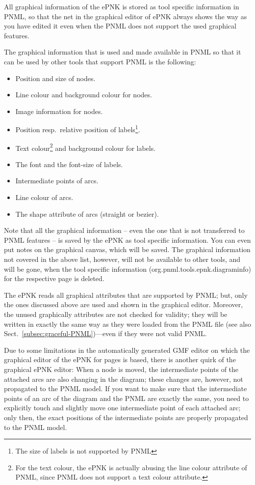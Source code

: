 All graphical information of the ePNK is stored as tool specific information in PNML,
so that the net in the graphical editor of ePNK always shows the way as you have
edited it even when the PNML does not support the used graphical features.

The graphical information that is used and made available in PNML
so that it can be used by other tools that support PNML is the following:
\begin{itemize}
  \item Position and size of nodes.
  \item Line colour and background colour for nodes.
  \item Image information for nodes.
  \item Position resp.\ relative position of labels\footnote
          {The size of labels is not supported by PNML}.
  \item Text colour\footnote
          {For the text colour, the ePNK is actually abusing the line colour
           attribute of PNML, since PNML does not support a text colour
           attribute.}
        and background colour for labels.
  \item The font and the font-size of labels.
  \item Intermediate points of arcs.
  \item Line colour of arcs.
  \item The shape attribute of arcs (straight or bezier).
\end{itemize}

Note that all the graphical information -- even the one that is not transferred
to PNML features -- is saved by the ePNK as tool specific information. You can
even put notes on the graphical canvas, which will be saved. The graphical
information not covered in the above list, however, will not be available to
other tools, and will be gone, when the tool specific information
(org.pnml.tools.epnk.diagraminfo) for the respective page is deleted.

The ePNK reads all graphical attributes that are supported by PNML;
but, only the ones discussed above are used and shown in the graphical editor.
Moreover, the unused graphically attributes are not checked for
validity; they will be written in exactly the same way as they were loaded
from the PNML file (see also Sect.~\ref{subsec:graceful-PNML})---even if
they were not valid PNML.

Due to some limitations in the automatically generated GMF editor on which
the graphical editor of the ePNK for pages is based, there is another quirk
of the graphical ePNK editor: When a node is moved, the intermediate points of
the attached arcs are also changing in the diagram; these changes are, however,
not propagated to the PNML model. If you want to make sure that the
intermediate points of an arc of the diagram and the PNML are exactly the same,
you need to explicitly touch and slightly move one intermediate point of each
attached arc; only then, the exact positions of the intermediate points
are properly propagated to the PNML model.

